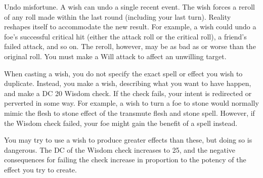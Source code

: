 \begin{spelleffect}
\begin{itemize*}
    \item Undo misfortune. A wish can undo a single recent event. The wish forces a reroll of any roll made within the last round (including your last turn). Reality reshapes itself to accommodate the new result. For example, a wish could undo a foe's successful critical hit (either the attack roll or the critical roll), a friend's failed attack, and so on. The reroll, however, may be as bad as or worse than the original roll. You must make a Will attack to affect an unwilling target.
  \end{itemize*}
  \par When casting a wish, you do not specify the exact spell or effect you wish to duplicate. Instead, you make a wish, describing what you want to have happen, and make a DC 20 Wisdom check. If the check fails, your intent is redirected or perverted in some way. For example, a wish to turn a foe to stone would normally mimic the flesh to stone effect of the transmute flesh and stone spell. However, if the Wisdom check failed, your foe might gain the benefit of a  spell instead.
  \par You may try to use a wish to produce greater effects than these, but doing so is dangerous. The DC of the Wisdom check increases to 25, and the negative consequences for failing the check increase in proportion to the potency of the effect you try to create.
\end{spelleffect}


